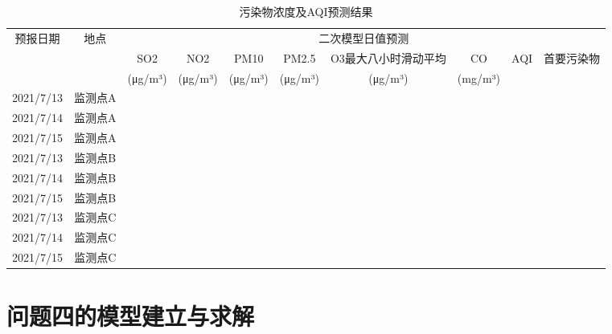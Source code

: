 \documentclass[a4paper,10pt]{my_paper}
\numberwithin{equation}{section}
\begin{document}
\begin{table}[htbp]
  \centering
  \caption{污染物浓度及AQI预测结果}
    \begin{tabular}{ccrrrrrrrr}
    \toprule
    \multirow{3}[2]{*}{预报日期} & \multirow{3}[2]{*}{地点} & \multicolumn{8}{c}{二次模型日值预测} \\
          &       & \multicolumn{1}{c}{SO2 } & \multicolumn{1}{c}{NO2 } & \multicolumn{1}{c}{PM10 } & \multicolumn{1}{c}{PM2.5 } & \multicolumn{1}{c}{O3最大八小时滑动平均} & \multicolumn{1}{c}{CO} & \multicolumn{1}{c}{\multirow{2}[1]{*}{AQI}} & \multicolumn{1}{c}{\multirow{2}[1]{*}{首要污染物}} \\
          &       & \multicolumn{1}{c}{(μg/m³)} & \multicolumn{1}{c}{(μg/m³)} & \multicolumn{1}{c}{(μg/m³)} & \multicolumn{1}{c}{(μg/m³)} & \multicolumn{1}{c}{ (μg/m³)} & \multicolumn{1}{c}{ (mg/m³)} &       &  \\
    \midrule
    2021/7/13 & 监测点A  &       &       &       &       &       &       &       &  \\
    2021/7/14 & 监测点A  &       &       &       &       &       &       &       &  \\
    2021/7/15 & 监测点A  &       &       &       &       &       &       &       &  \\
    2021/7/13 & 监测点B  &       &       &       &       &       &       &       &  \\
    2021/7/14 & 监测点B  &       &       &       &       &       &       &       &  \\
    2021/7/15 & 监测点B  &       &       &       &       &       &       &       &  \\
    2021/7/13 & 监测点C  &       &       &       &       &       &       &       &  \\
    2021/7/14 & 监测点C  &       &       &       &       &       &       &       &  \\
    2021/7/15 & 监测点C  &       &       &       &       &       &       &       &  \\
    \bottomrule
    \end{tabular}%
  \label{tab:addlabel}%
\end{table}%




\section{问题四的模型建立与求解}
\end{document}
